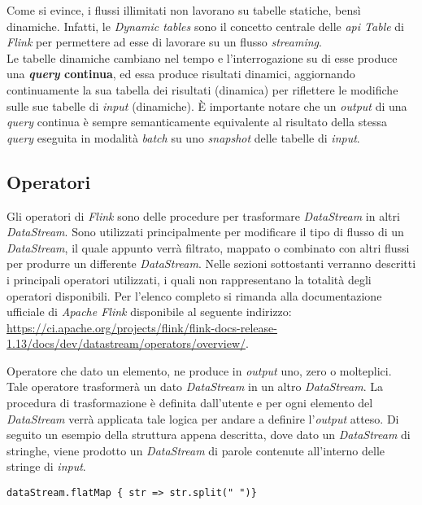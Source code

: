 Come si evince, i flussi illimitati non lavorano su tabelle statiche, bensì dinamiche. Infatti, le \textit{Dynamic tables} sono il concetto centrale delle \textit{\textit{\gls{api}} Table} di \textit{Flink} per permettere ad esse di lavorare su un flusso \textit{streaming}.\\
Le tabelle dinamiche cambiano nel tempo e l'interrogazione su di esse produce una \textbf{\textit{\gls{query}} continua}, ed essa produce risultati dinamici, aggiornando continuamente la sua tabella dei risultati (dinamica) per riflettere le modifiche sulle sue tabelle di \textit{input} (dinamiche). È importante notare che un \textit{output} di una \textit{\gls{query}} continua è sempre semanticamente equivalente al risultato della stessa \textit{\gls{query}} eseguita in modalità \textit{batch} su uno \textit{\gls{snapshot}} delle tabelle di \textit{input}.



\subsection{Operatori}\label{sec:operatori}
Gli operatori di \textit{Flink} sono delle procedure per trasformare \textit{DataStream} in altri \textit{DataStream}. Sono utilizzati principalmente per modificare il tipo di flusso di un \textit{DataStream}, il quale appunto verrà filtrato, mappato o combinato con altri flussi per produrre un differente \textit{DataStream}. Nelle sezioni sottostanti verranno descritti i principali operatori utilizzati, i quali non rappresentano la totalità degli operatori disponibili. Per l'elenco completo si rimanda alla documentazione ufficiale di \textit{Apache Flink} disponibile al seguente indirizzo: \url{https://ci.apache.org/projects/flink/flink-docs-release-1.13/docs/dev/datastream/operators/overview/}.

Operatore che dato un elemento, ne produce in \textit{output} uno, zero o molteplici. Tale operatore trasformerà un dato \textit{DataStream} in un altro \textit{DataStream}. La procedura di trasformazione è definita dall'utente e per ogni elemento del \textit{DataStream} verrà applicata tale logica per andare a definire l'\textit{output} atteso. Di seguito un esempio della struttura appena descritta, dove dato un \textit{DataStream} di stringhe, viene prodotto un \textit{DataStream} di parole contenute all'interno delle stringe di \textit{input}.

\begin{verbatim}
dataStream.flatMap { str => str.split(" ")}
\end{verbatim}
	
